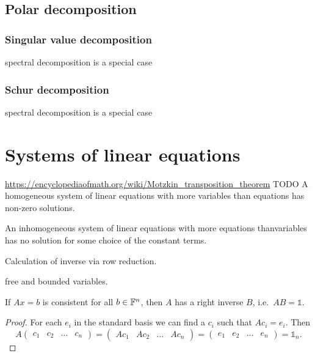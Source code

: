 \subsection{Polar decomposition}
\subsubsection{Singular value decomposition}
spectral decomposition is a special case
\subsubsection{Schur decomposition}
spectral decomposition is a special case




\section{Systems of linear equations}
\url{https://encyclopediaofmath.org/wiki/Motzkin_transposition_theorem}
TODO
A homogeneous system of linear equations with more variables than equations has non-zero solutions.

An inhomogeneous system of linear equations with more equations thanvariables has no solution for some choice of the constant terms.

Calculation of inverse via row reduction.

free and bounded variables.

\begin{lemma}
If $Ax=b$ is consistent for all $b\in \mathbb{F}^n$, then $A$ has a right inverse $B$, i.e.\ $AB = \mathbb{1}$.
\end{lemma}
\begin{proof}
For each $e_i$ in the standard basis we can find a $c_i$ such that $Ac_i = e_i$. Then
\[ A \begin{pmatrix}
c_1 & c_2 & \hdots & c_n
\end{pmatrix} = \begin{pmatrix}
Ac_1 & Ac_2 & \hdots & Ac_n
\end{pmatrix} = \begin{pmatrix}
e_1 & e_2 & \hdots & e_n
\end{pmatrix} = \mathbb{1}_n. \]
\end{proof}

